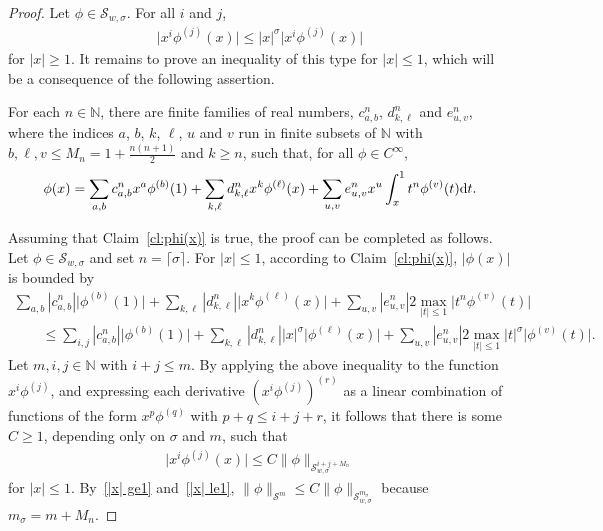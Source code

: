 \documentclass[pdftex]{sigma}
\newcommand{\N}{\mathbb{N}}
\renewcommand{\SS}{\mathcal{S}}
\newcommand{\Cinf}{C^\infty}
\begin{document}
\begin{proof}
  Let $\phi\in\SS_{w,\sigma}$. For all $i$ and $j$,
    \begin{gather}\label{|x| ge1}
      \big|x^i\phi^{(j)}(x)\big|\le |x|^\sigma\big|x^i\phi^{(j)}(x)\big|
    \end{gather}
  for $|x|\ge1$. It remains to prove an inequality of this type for $|x|\le1$, which will be a consequence of the following assertion.

  \begin{claim}\label{cl:phi(x)}
      For each $n\in\N$, there are f\/inite families of real numbers, $c^n_{a,b}$, $d^n_{k,\ell}$ and $e^n_{u,v}$, where the indices $a$, $b$, $k$, $\ell$, $u$ and $v$ run in f\/inite subsets of $\N$ with $b,\ell,v\le M_n=1+\frac{n(n+1)}{2}$ and $k\ge n$, such that, for all $\phi\in\Cinf$,
        \[
          \phi(x)=\sum_{a,b}c^n_{a,b}x^a\phi^{(b)}(1)+\sum_{k,\ell}d^n_{k,\ell}x^k\phi^{(\ell)}(x)
          +\sum_{u,v}e^n_{u,v}x^u\int_x^1t^n\phi^{(v)}(t){\rm d} t .
        \]
    \end{claim}

  Assuming that Claim~\ref{cl:phi(x)} is true, the proof can be completed as follows. Let $\phi\in\SS_{w,\sigma}$ and set $n=\lceil\sigma\rceil$. For $|x|\le1$, according to Claim~\ref{cl:phi(x)}, $|\phi(x)|$ is bounded by
    \begin{gather*}
      \sum_{a,b}|c^n_{a,b}|\big|\phi^{(b)}(1)\big|+\sum_{k,\ell}|d^n_{k,\ell}|\big|x^k\phi^{(\ell)}(x)\big|
       +\sum_{u,v}|e^n_{u,v}| 2\max_{|t|\le1}\big|t^n\phi^{(v)}(t)\big|\\
     \qquad{}  \le\sum_{i,j}|c^n_{a,b}|\big|\phi^{(b)}(1)\big|+\sum_{k,\ell}|d^n_{k,\ell}| |x|^\sigma\big|\phi^{(\ell)}(x)\big|
       +\sum_{u,v}|e^n_{u,v}| 2\max_{|t|\le1}|t|^\sigma\big|\phi^{(v)}(t)\big| .
    \end{gather*}
  Let $m,i,j\in\N$ with $i+j\le m$. By applying the above inequality to the function $x^i\phi^{(j)}$, and expressing each derivative $(x^i\phi^{(j)})^{(r)}$ as a linear combination of functions of the form $x^p\phi^{(q)}$ with $p+q\le i+j+r$, it follows that there is some $C\ge1$, depending only on $\sigma$ and $m$, such that
    \begin{gather}\label{|x| le1}
      \big|x^i\phi^{(j)}(x)\big|\le C \|\phi\|_{\SS_{w,\sigma}^{i+j+M_n}}
    \end{gather}
  for $|x|\le1$. By~\eqref{|x| ge1} and~\eqref{|x| le1}, $\|\phi\|_{\SS^m}\le C \|\phi\|_{\SS_{w,\sigma}^{m_\sigma}}$ because $m_\sigma=m+M_n$.


\end{proof}
\end{document}
